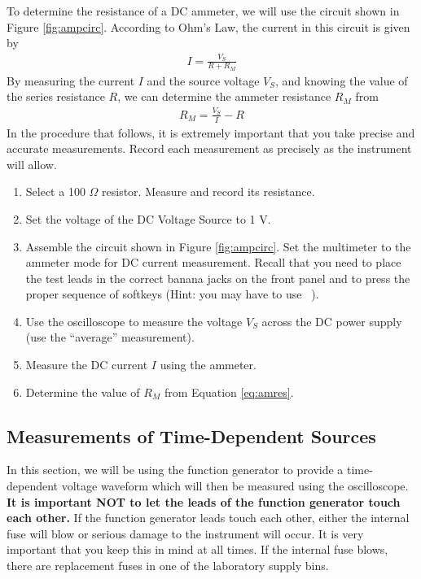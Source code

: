 \documentclass[12pt]{../manual}
\begin{document}
To determine the resistance of a DC ammeter, we will use the circuit shown in Figure \ref{fig:ampcirc}. According to Ohm's Law, the current in this circuit is given by
\begin{align}
I = \frac{V_S}{R + R_M}
\end{align}
By measuring the current $I$ and the source voltage $V_S$, and knowing the value of the series resistance $R$, we can determine the ammeter resistance $R_M$ from
\begin{align}
R_M = \frac{V_S}{I} - R \label{eq:amres}
\end{align}
In the procedure that follows, it is extremely important that you take precise and accurate measurements. Record each measurement as precisely as the instrument will allow.
\begin{enumerate}
\item Select a 100 $\Omega$ resistor. Measure and record its resistance. 
\item Set the voltage of the DC Voltage Source to 1 V.
\item Assemble the circuit shown in Figure \ref{fig:ampcirc}. Set the multimeter to the ammeter mode for DC current measurement. Recall that you need to place the test leads in the correct banana jacks on the front panel and to press the proper sequence of softkeys (Hint: you may have to use ~). 
\item Use the oscilloscope to measure the voltage $V_S$ across the DC power supply (use the ``average'' measurement).
\item Measure the DC current $I$ using the ammeter. 
\item Determine the value of $R_M$ from Equation \eqref{eq:amres}. 
\end{enumerate}

\subsection{Measurements of Time-Dependent Sources}
In this section, we will be using the function generator to provide a time-dependent voltage waveform which will then be measured using the oscilloscope. \textbf{It is important NOT to let the leads of the function generator touch each other.} If the function generator leads touch each other, either the internal fuse will blow or serious damage to the instrument will occur. It is very important that you keep this in mind at all times. If the internal fuse blows, there are replacement fuses in one of the laboratory supply bins.
\end{document}
